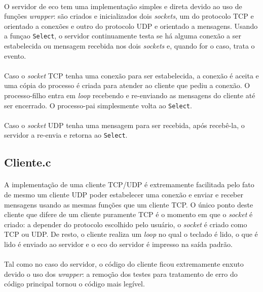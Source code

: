 \documentclass[a4paper,10pt,oneside,final,titlepage,onecolumn]{article}
\begin{document}
\paragraph{}O servidor de eco tem uma implementação simples e direta devido ao uso de funções \emph{wrapper}: são criados e inicializados dois \emph{sockets}, um do protocolo TCP e orientado a conexões e outro do protocolo UDP e orientado a mensagens. Usando a funçao \verb|Select|, o servidor continuamente testa se há alguma conexão a ser estabelecida ou mensagem recebida nos dois \emph{sockets} e, quando for o caso, trata o evento.
\paragraph{}Caso o \emph{socket} TCP tenha uma conexão para ser estabelecida, a conexão é aceita e uma cópia do processo é criada para atender ao cliente que pediu a conexão. O processo-filho entra em \emph{loop} recebendo e re-enviando as mensagens do cliente até ser encerrado. O processo-pai simplesmente volta ao \verb|Select|.
\paragraph{}Caso o \emph{socket} UDP tenha uma mensagem para ser recebida, após recebê-la, o servidor a re-envia e retorna ao \verb|Select|.
\subsection{Cliente.c}
\paragraph{}A implementação de uma cliente TCP/UDP é extremamente facilitada pelo fato de mesmo um cliente UDP poder estabelecer uma conexão e enviar e receber mensagens usando as mesmas funções que um cliente TCP. O único ponto deste cliente que difere de um cliente puramente TCP é o momento em que o \emph{socket} é criado: a depender do protocolo escolhido pelo usuário, o \emph{socket} é criado como TCP ou UDP. De resto, o cliente realiza um \emph{loop} no qual o teclado é lido, o que é lido é enviado ao servidor e o eco do servidor é impresso na saída padrão.
\paragraph{}Tal como no caso do servidor, o código do cliente ficou extremamente enxuto devido o uso dos \emph{wrapper}: a remoção dos testes para tratamento de erro do código principal tornou o código mais legível.
\end{document}
